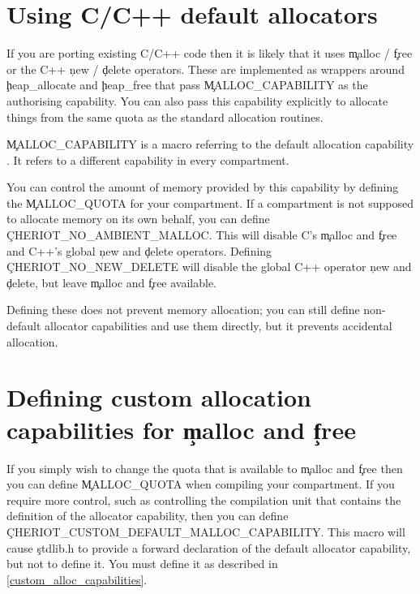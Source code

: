 
\section{Using C/C++ default allocators}

If you are porting existing C/C++ code then it is likely that it uses \c{malloc} / \c{free} or the C++ \c{new} / \c{delete} operators.
These are implemented as wrappers around \c{heap_allocate} and \c{heap_free} that pass \c{MALLOC_CAPABILITY} as the authorising capability.
You can also pass this capability explicitly to allocate things from the same quota as the standard allocation routines.

\begin{note}
	\c{MALLOC_CAPABILITY} is a macro referring to the default allocation capability .
	It refers to a different capability in every compartment.
\end{note}

You can control the amount of memory provided by this capability by defining the \c{MALLOC_QUOTA} for your compartment.
If a compartment is not supposed to allocate memory on its own behalf, you can define \c{CHERIOT_NO_AMBIENT_MALLOC}.
This will disable C's \c{malloc} and \c{free} and C++'s global \c{new} and \c{delete} operators.
Defining \c{CHERIOT_NO_NEW_DELETE} will disable the global C++ operator \c{new} and \c{delete}, but leave \c{malloc} and \c{free} available.

Defining these does not prevent memory allocation; you can still define non-default allocator capabilities and use them directly, but it prevents accidental allocation.

\section{Defining custom allocation capabilities for \c{malloc} and \c{free}}

If you simply wish to change the quota that is available to \c{malloc} and \c{free} then you can define \c{MALLOC_QUOTA} when compiling your compartment.
If you require more control, such as controlling the compilation unit that contains the definition of the allocator capability, then you can define \c{CHERIOT_CUSTOM_DEFAULT_MALLOC_CAPABILITY}.
This macro will cause \c{stdlib.h} to provide a forward declaration of the default allocator capability, but not to define it.
You must define it as described in \ref{custom_alloc_capabilities}.


